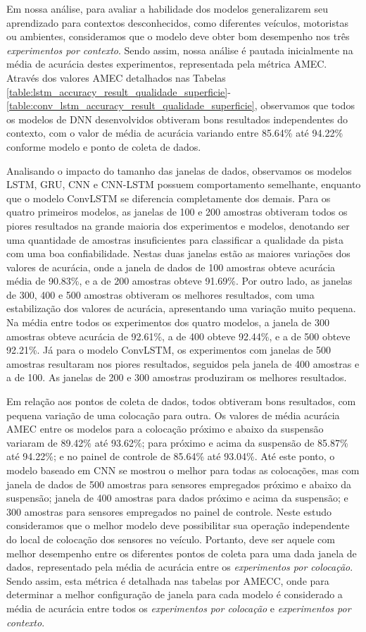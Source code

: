 Em nossa análise, para avaliar a habilidade dos modelos generalizarem seu aprendizado para contextos desconhecidos, como diferentes veículos, motoristas ou ambientes, consideramos que o modelo deve obter bom desempenho nos três \emph{experimentos por contexto}. Sendo assim, nossa análise é pautada inicialmente na média de acurácia destes experimentos, representada pela métrica AMEC. Através dos valores AMEC detalhados nas Tabelas \ref{table:lstm_accuracy_result_qualidade_superficie}-\ref{table:conv_lstm_accuracy_result_qualidade_superficie}, observamos que todos os modelos de DNN desenvolvidos obtiveram bons resultados independentes do contexto, com o valor de média de acurácia variando entre 85.64\% até 94.22\% conforme modelo e ponto de coleta de dados.

Analisando o impacto do tamanho das janelas de dados, observamos os modelos LSTM, GRU, CNN e CNN-LSTM possuem comportamento semelhante, enquanto que o modelo ConvLSTM se diferencia completamente dos demais. Para os quatro primeiros modelos, as janelas de 100 e 200 amostras obtiveram todos os piores resultados na grande maioria dos experimentos e modelos, denotando ser uma quantidade de amostras insuficientes para classificar a qualidade da pista com uma boa confiabilidade. Nestas duas janelas estão as maiores variações dos valores de acurácia, onde a janela de dados de 100 amostras obteve acurácia média de 90.83\%, e a de 200 amostras obteve 91.69\%. Por outro lado, as janelas de 300, 400 e 500 amostras obtiveram os melhores resultados, com uma estabilização dos valores de acurácia, apresentando uma variação muito pequena. Na média entre todos os experimentos dos quatro modelos, a janela de 300 amostras obteve acurácia de 92.61\%, a de 400 obteve 92.44\%, e a de 500 obteve 92.21\%. Já para o modelo ConvLSTM, os experimentos com janelas de 500 amostras resultaram nos piores resultados, seguidos pela janela de 400 amostras e a de 100. As janelas de 200 e 300 amostras produziram os melhores resultados.

Em relação aos pontos de coleta de dados, todos obtiveram bons resultados, com pequena variação de uma colocação para outra. Os valores de média acurácia AMEC entre os modelos para a colocação próximo e abaixo da suspensão variaram de 89.42\% até 93.62\%; para próximo e acima da suspensão de 85.87\% até 94.22\%; e no painel de controle de 85.64\% até 93.04\%. Até este ponto, o modelo baseado em CNN se mostrou o melhor para todas as colocações, mas com janela de dados de 500 amostras para sensores empregados próximo e abaixo da suspensão; janela de 400 amostras para dados próximo e acima da suspensão; e 300 amostras para sensores empregados no painel de controle. Neste estudo consideramos que o melhor modelo deve possibilitar sua operação independente do local de colocação dos sensores no veículo. Portanto, deve ser aquele com melhor desempenho entre os diferentes pontos de coleta para uma dada janela de dados, representado pela média de acurácia entre os \emph{experimentos por colocação}. Sendo assim, esta métrica é detalhada nas tabelas por AMECC, onde para determinar a melhor configuração de janela para cada modelo é considerado a média de acurácia entre todos os \emph{experimentos por colocação} e \emph{experimentos por contexto}.


